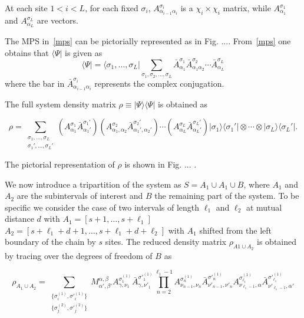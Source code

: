 \documentclass[twocolumn,superscriptaddress,prb,10pt]{revtex4-1}
\begin{document}
At each site $1<i<L$, for each fixed $\sigma_i$, $A^{\sigma_i}_{\alpha_{i-1}\alpha_i}$ 
is a $\chi_i\times\chi_i$ matrix, while $A^{\sigma_1}_{\alpha_1}$ and 
$A^{\sigma_L}_{\alpha_L}$ are vectors. 

The MPS in~\eqref{mps} can be pictorially represented as in Fig. .... From~\eqref{mps} 
one obtains that $\langle\Psi|$ is given as 
%
\begin{equation}
\langle\Psi|=\langle\sigma_1,\dots,\sigma_L| \sum\limits_{\sigma_1,\sigma_2,
\dots,\sigma_L}\bar A^{\sigma_1}_{\alpha_1}\bar A^{\sigma_2}_{\alpha_1\alpha_2}\cdots 
\bar A^{\sigma_L}_{\alpha_L}
\label{mps_conj} 
\end{equation}
%
where the bar in $\bar A^{\sigma_i}_{\alpha_{i-1}\alpha_i}$ represents the complex 
conjugation. 

The full system density matrix $\rho\equiv|\Psi\rangle\langle\Psi|$ is obtained as
%
\begin{widetext}
%
\begin{equation}
\rho=\sum\limits_{\substack{\sigma_1,\dots,\sigma_L\\\sigma_1',\dots,\sigma_L'}}
(A^{\sigma_1}_{\alpha_1}\bar A^{\sigma_1'}_{\alpha_1'})(A^{\sigma_2}_{\alpha_1,\alpha_2}
\bar A^{\sigma_2'}_{\alpha_1',\alpha_2'})\cdots (A^{\sigma_L}_{\alpha_L}
\bar A^{\sigma_L'}_{\alpha_L'})|\sigma_1\rangle\langle\sigma_1'|\otimes\cdots\otimes
|\sigma_L\rangle\langle\sigma_L'|. 
\end{equation}
%
\end{widetext}
%
The pictorial representation of $\rho$ is shown in Fig. ... . 

We now introduce a tripartition of the system as $S=A_1\cup A_1\cup B$, where $A_1$ and 
$A_2$ are the subintervals of interest and $B$ the remaining part of the system. 
To be specific we consider the case of two intervals of length $\ell_1$ and $\ell_2$ 
at mutual distance $d$ with $A_1=[s+1,\dots,s+\ell_1]$ $A_2=[s+\ell_1+d+1,\dots,s+
\ell_1+d+\ell_2]$ with $A_1$ shifted from the left boundary of the chain by $s$ sites.
The reduced density matrix $\rho_{A1\cup A_2}$ is obtained by tracing over the degrees 
of freedom of $B$ as 
%
\begin{widetext}
\begin{equation}
\rho_{A_1\cup A_2}=\sum\limits_{\substack{\{\sigma^{(1)}_i,\sigma'^{(1)}_{i}\}\\
\{\sigma^{(2)}_j,\sigma'^{(2)}_{j}\}}}
M^{\alpha,\beta}_{\alpha',\beta'}A^{\sigma^{(1)}_1}_{\gamma,\nu_1}\bar 
A^{\sigma'^{(1)}_1}_{\gamma,\nu'_1}\prod\limits_{n=2}^{\ell_1-1}
A^{\sigma^{(1)}_n}_{\nu_{n-1},\nu_n}\bar A^{\sigma'^{(1)}_n}_{\nu'_{n-1},\nu'_n}
A^{\sigma^{(1)}_{\ell_1}}_{\nu_{\ell_1-1},\alpha}\bar A^{\sigma'^{(1)}_{\ell_1}}_{\nu'_{\ell_1-1},\alpha'}
\end{equation}
\end{widetext}
%
\end{document}
